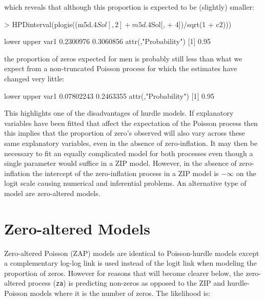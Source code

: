 \documentclass{article}
\begin{document}
which reveals that although this proportion is expected to be (slightly) smaller: 


\begin{Schunk}
\begin{Sinput}
> HPDinterval(plogis((m5d.4$Sol[, 2] + m5d.4$Sol[, 
+     4])/sqrt(1 + c2)))
\end{Sinput}
\begin{Soutput}
         lower     upper
var1 0.2300976 0.3060856
attr(,"Probability")
[1] 0.95
\end{Soutput}
\end{Schunk}


the proportion of zeros expected for men is probably still less than what we expect from a non-truncated Poisson process for which the estimates have changed very little:

\begin{Schunk}
\begin{Soutput}
          lower     upper
var1 0.07802243 0.2463355
attr(,"Probability")
[1] 0.95
\end{Soutput}
\end{Schunk}


This highlights one of the disadvantages of hurdle models. If explanatory variables have been fitted that affect the expectation of the Poisson process then this implies that the proportion of zero's observed will also vary across these same explanatory variables, even in the absence of zero-inflation. It may then be necessary to fit an equally complicated model for both processes even though a single parameter would suffice in a ZIP model. However, in the absence of zero-inflation the intercept of the zero-inflation process in a ZIP model is $-\infty$ on the logit scale causing numerical and inferential problems. An alternative type of model are zero-altered models. 

\section{Zero-altered Models}
\label{ZAP}

Zero-altered Poisson (ZAP) models are identical to Poisson-hurdle models except a complementary log-log link is used instead of the logit link when modeling the proportion of zeros. However for reasons that will become clearer below, the zero-altered process (\texttt{za}) is predicting non-zeros as opposed to the ZIP and hurdle-Poisson models where it is the number of zeros.  The likelihood is:
\end{document}
